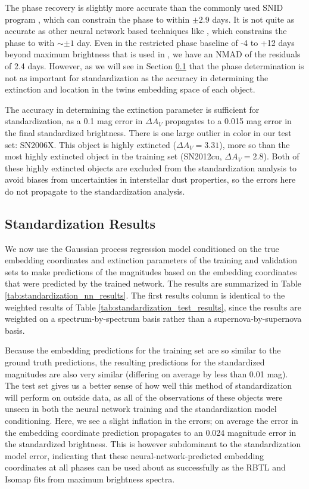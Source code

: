 The phase recovery is slightly more accurate than the commonly used SNID program \citep{blondin_determining_2007}, which can constrain the phase to within $\pm 2.9$ days. It is not quite as accurate as other neural network based techniques like \citet{stahl_deepsip_2020}, which constrains the phase to with $\sim\pm 1$ day. Even in the restricted phase baseline of -4 to +12 days beyond maximum brightness that is used in \citet{stahl_deepsip_2020}, we have an NMAD of the residuals of 2.4 days. However, as we will see in Section \ref{sec:standardization} that the phase determination is not as important for standardization as the accuracy in determining the extinction and location in the twins embedding space of each object. 

The accuracy in determining the extinction parameter is sufficient for standardization, as a 0.1 mag error in $\Delta A_V$ propagates to a 0.015 mag error in the final standardized brightness. There is one large outlier in color in our test set: SN2006X. This object is highly extincted ($\Delta A_V=3.31$), more so than the most highly extincted object in the training set (SN2012cu, $\Delta A_V=2.8$). Both of these highly extincted objects are excluded from the standardization analysis to avoid biases from uncertainties in interstellar dust properties, so the errors here do not propagate to the standardization analysis.

\subsection{Standardization Results} 
\label{sec:standardization}
We now use the Gaussian process regression model conditioned on the true embedding coordinates and extinction parameters of the training and validation sets to make predictions of the magnitudes based on the embedding coordinates that were predicted by the trained \stoe{} network. The results are summarized in Table \ref{tab:standardization_nn_results}. The first results column is identical to the weighted results of Table \ref{tab:standardization_test_results}, since the results are weighted on a spectrum-by-spectrum basis rather than a supernova-by-supernova basis.

Because the embedding predictions for the training set are so similar to the ground truth predictions, the resulting predictions for the standardized magnitudes are also very similar (differing on average by less than 0.01 mag). The test set gives us a better sense of how well this method of standardization will perform on outside data, as all of the observations of these objects were unseen in both the neural network training and the standardization model conditioning. Here, we see a slight inflation in the errors; on average the error in the embedding coordinate prediction propagates to an 0.024 magnitude error in the standardized brightness. This is however subdominant to the standardization model error, indicating that these neural-network-predicted embedding coordinates at all phases can be used about as successfully as the RBTL and Isomap fits from maximum brightness spectra.


